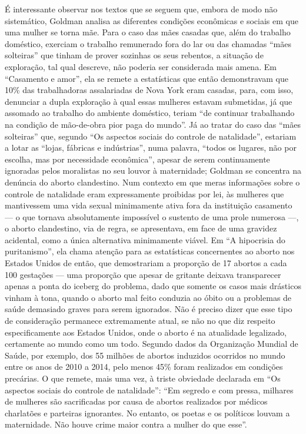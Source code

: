 É interessante observar nos textos que se seguem que, embora de modo não
sistemático, Goldman analisa as diferentes condições econômicas e
sociais em que uma mulher se torna mãe. Para o caso das mães casadas
que, além do trabalho doméstico, exerciam o trabalho remunerado fora do
lar ou das chamadas ``mães solteiras'' que tinham de prover sozinhas os
seus rebentos, a situação de exploração, tal qual descreve, não poderia
ser considerada mais amena. Em ``Casamento e amor'', ela se remete a
estatísticas que então demonstravam que 10\% das trabalhadoras
assalariadas de Nova York eram casadas, para, com isso, denunciar a
dupla exploração à qual essas mulheres estavam submetidas, já que
assomado ao trabalho do ambiente doméstico, teriam ``de continuar
trabalhando na condição de mão-de-obra pior paga do mundo''. Já ao
tratar do caso das ``mães solteiras'' que, segundo ``Os aspectos sociais
do controle de natalidade'', estariam a lotar as ``lojas, fábricas e
indústrias'', numa palavra, ``todos os lugares, não por escolha, mas por
necessidade econômica'', apesar de serem continuamente ignoradas pelos
moralistas no seu louvor à maternidade; Goldman se concentra na denúncia
do aborto clandestino. Num contexto em que meras informações sobre o
controle de natalidade eram expressamente proibidas por lei, às mulheres
que mantivessem uma vida sexual minimamente ativa fora da instituição
casamento --- o que tornava absolutamente impossível o sustento de uma
prole numerosa ---, o aborto clandestino, via de regra, se apresentava,
em face de uma gravidez acidental, como a única alternativa minimamente
viável. Em ``A hipocrisia do puritanismo'', ela chama atenção para as
estatísticas concernentes ao aborto nos Estados Unidos de então, que
demostrariam a proporção de 17 abortos a cada 100 gestações --- uma
proporção que apesar de gritante deixava transparecer apenas a ponta do
iceberg do problema, dado que somente os casos mais drásticos vinham à
tona, quando o aborto mal feito conduzia ao óbito ou a problemas de
saúde demasiado graves para serem ignorados. Não é preciso dizer que
esse tipo de consideração permanece extremamente atual, se não no que
diz respeito especificamente aos Estados Unidos, onde o aborto é na
atualidade legalizado, certamente ao mundo como um todo. Segundo dados
da Organização Mundial de Saúde, por exemplo, dos 55 milhões de abortos
induzidos ocorridos no mundo entre os anos de 2010 a 2014, pelo menos
45\% foram realizados em condições precárias. O que remete, mais uma
vez, à triste obviedade declarada em ``Os aspectos sociais do controle
de natalidade'': ``Em segredo e com pressa, milhares de mulheres são
sacrificadas por causa de abortos realizados por médicos charlatões e
parteiras ignorantes. No entanto, os poetas e os políticos louvam a
maternidade. Não houve crime maior contra a mulher do que esse''.

